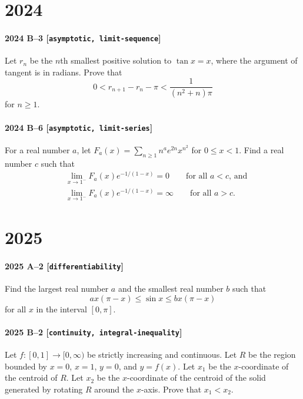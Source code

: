 \documentclass[11pt]{article}
\begin{document}
\section*{2024}

\paragraph{2024 B--3 \textnormal{[\texttt{asymptotic, limit-sequence}]}}
Let $r_n$ be the $n$th smallest positive solution to $\tan x = x$, where the argument of tangent is in radians. Prove that
\[
0 < r_{n+1} - r_n - \pi < \frac{1}{(n^2+n)\pi}
\]
for $n \geq 1$.

\paragraph{2024 B--6 \textnormal{[\texttt{asymptotic, limit-series}]}}
For a real number $a$, let $F_a(x) = \sum_{n \geq 1} n^a e^{2n} x^{n^2}$ for $0 \leq x < 1$.
Find a real number $c$ such that
\begin{align*}
& \lim_{x \to 1^-} F_a(x) e^{-1/(1-x)} = 0 \qquad \mbox{for all $a < c$, and} \\
& \lim_{x \to 1^-} F_a(x) e^{-1/(1-x)} = \infty \qquad \mbox{for all $a > c$.}
\end{align*}

\section*{2025}

\paragraph{2025 A--2 \textnormal{[\texttt{differentiability}]}}
Find the largest real number $a$ and the smallest real number $b$ such that
\[
ax(\pi-x) \leq \sin x \leq bx(\pi-x)
\]
for all $x$ in the interval $[0, \pi]$.

\paragraph{2025 B--2 \textnormal{[\texttt{continuity, integral-inequality}]}}
Let $f\colon [0,1] \to [0, \infty)$ be strictly increasing and continuous. Let $R$ be the region bounded by $x=0$, $x=1$, $y=0$, and $y=f(x)$. Let $x_1$ be the $x$-coordinate of the centroid of $R$. Let $x_2$ be the $x$-coordinate of the centroid of the solid generated by rotating $R$ around the $x$-axis. Prove that $x_1 < x_2$.
\end{document}
